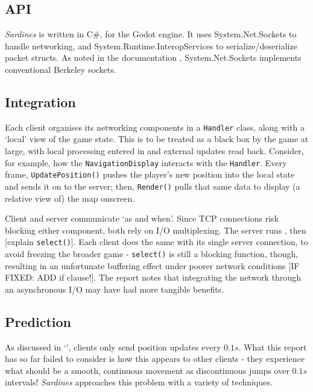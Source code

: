 \documentclass[a4paper, 9pt]{article}
\begin{document}
\begin{flushleft}
\subsection*{API}

\textit{Sardines} is written in C\#, for the Godot engine. It uses System.Net.Sockets to handle networking, and System.Runtime.InteropServices to serialize/deserialize packet structs. As noted in the documentation \citeyearpar{msftSNS}, System.Net.Sockets implements conventional Berkeley sockets.

\subsection*{Integration}

Each client organises its networking components in a \texttt{Handler} class, along with a `local' view of the game state. This is to be treated as a black box by the game at large, with local processing entered in and external updates read back. Consider, for example, how the \texttt{NavigationDisplay} interacts with the \texttt{Handler}. Every frame, \texttt{UpdatePosition()} pushes the player's new position into the local state and sends it on to the server; then, \texttt{Render()} pulls that same data to display (a relative view of) the map onscreen.

\vspace{5pt}\noindent
Client and server communicate `as and when'. Since TCP connections risk blocking either component, both rely on I/O multiplexing. The server runs , then [explain \texttt{select()}]. Each client does the same with its single server connection, to avoid freezing the broader game - \texttt{select()} is still a blocking function, though, resulting in an unfortunate buffering effect under poorer network conditions [IF FIXED: ADD if clause!]. The report notes that integrating the network through an asynchronous I/O may have had more tangible benefits.

\subsection*{Prediction}\label{Prediction}

As discussed in `',  clients only send position updates every $0.1s$. What this report has so far failed to consider is how this appears to other clients - they experience what should be a smooth, continuous movement as discontinuous jumps over $0.1s$ intervals! \textit{Sardines} approaches this problem with a variety of techniques.


\end{flushleft}
\end{document}
